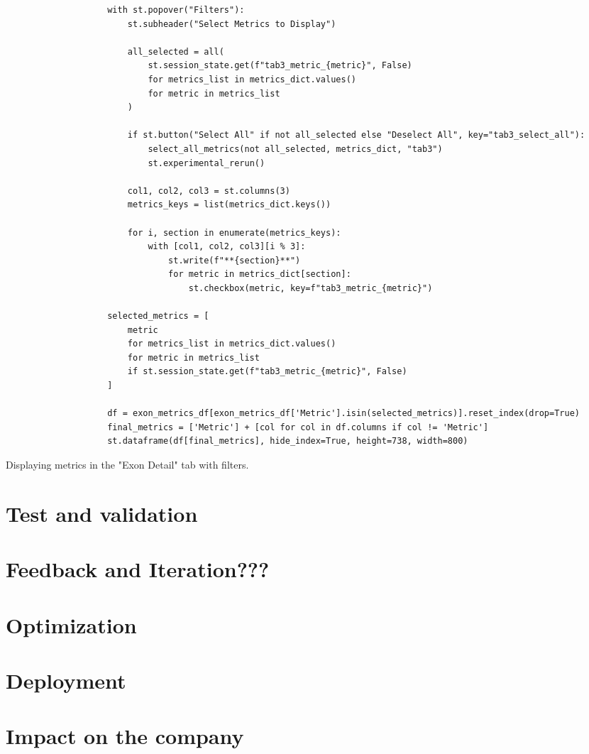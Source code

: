 \begin{longlisting}
\begin{verbatim}
                    with st.popover("Filters"):
                        st.subheader("Select Metrics to Display")

                        all_selected = all(
                            st.session_state.get(f"tab3_metric_{metric}", False)
                            for metrics_list in metrics_dict.values()
                            for metric in metrics_list
                        )

                        if st.button("Select All" if not all_selected else "Deselect All", key="tab3_select_all"):
                            select_all_metrics(not all_selected, metrics_dict, "tab3")
                            st.experimental_rerun()

                        col1, col2, col3 = st.columns(3)
                        metrics_keys = list(metrics_dict.keys())

                        for i, section in enumerate(metrics_keys):
                            with [col1, col2, col3][i % 3]:
                                st.write(f"**{section}**")
                                for metric in metrics_dict[section]:
                                    st.checkbox(metric, key=f"tab3_metric_{metric}")

                    selected_metrics = [
                        metric
                        for metrics_list in metrics_dict.values()
                        for metric in metrics_list
                        if st.session_state.get(f"tab3_metric_{metric}", False)
                    ]

                    df = exon_metrics_df[exon_metrics_df['Metric'].isin(selected_metrics)].reset_index(drop=True)
                    final_metrics = ['Metric'] + [col for col in df.columns if col != 'Metric']
                    st.dataframe(df[final_metrics], hide_index=True, height=738, width=800)
\end{verbatim}
\caption{Displaying metrics in the "Exon Detail" tab with filters.}
\label{lbl:results11}
\end{longlisting}


\section{Test and validation}

\section{Feedback and Iteration???}

\section{Optimization}  

\section{Deployment}


\section{Impact on the company}